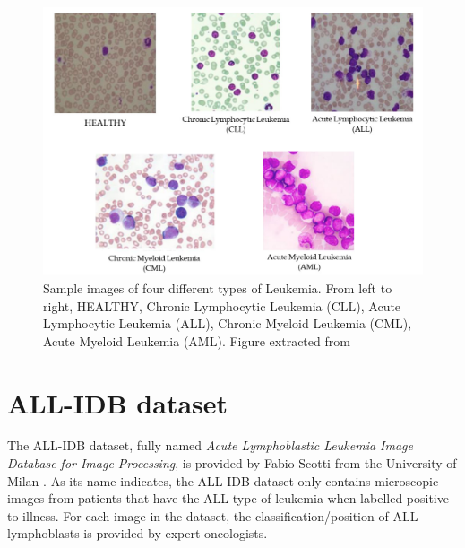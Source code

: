 \documentclass[11pt, openany]{report}
\theoremstyle{plain}
\theoremstyle{definition}
\theoremstyle{remark}
\begin{document}
\begin{figure}[H]
  \centering
  \includegraphics[scale=0.6]{figures/leukemia-subtypes.png}
  \caption{Sample images of four different types of Leukemia. From left to right, HEALTHY, Chronic Lymphocytic Leukemia (CLL), Acute Lymphocytic Leukemia (ALL), Chronic Myeloid Leukemia (CML), Acute Myeloid Leukemia (AML). Figure extracted from \cite{leukemia}}
  \label{fig:leukemia-subtypes}
\end{figure}

\newpage
\section{ALL-IDB dataset}
The ALL-IDB dataset, fully named \textit{Acute Lymphoblastic Leukemia Image Database for Image Processing}, is provided by Fabio Scotti from the University of Milan \cite{ALL-IDB}. As its name indicates, the ALL-IDB dataset only contains microscopic images from patients that have the ALL type of leukemia when labelled positive to illness. For each image in the dataset, the classification/position of ALL lymphoblasts is provided by expert oncologists. 
\end{document}
